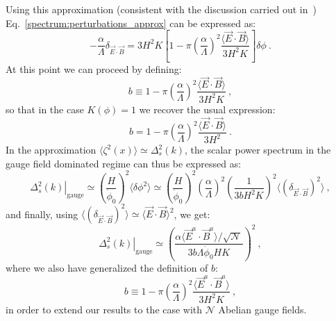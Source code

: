 Using this approximation (consistent with the discussion carried out in~\cite{Linde:2012bt}) Eq.~\eqref{spectrum:perturbations_approx} can be expressed as:
\begin{equation}
	-\frac{\alpha}{\Lambda} \delta_{\vec{E}\cdot \vec{B}} =  3H^2 K \left[ 1  - \pi \left( \frac{\alpha}{\Lambda} \right)^2  \frac{\langle \vec{E}\cdot \vec{B}\rangle}{3 H^2 K}  \right] \delta \phi \ . 
	\label{eq:phiEB}
\end{equation}
At this point we can proceed by defining:
\begin{equation}
	b \equiv  1  -  \pi \left( \frac{\alpha}{\Lambda} \right)^2  \frac{\langle \vec{E}\cdot \vec{B}\rangle}{3 H^2 K} \ ,
\end{equation}
so that in the case $K(\phi) = 1$ we recover the usual expression:
\begin{equation}
	b = 1  -  \pi \left( \frac{\alpha}{\Lambda} \right)^2 \frac{\langle \vec{E}\cdot \vec{B}\rangle}{3 H^2 } \ .
\end{equation}
In the approximation $\langle \zeta^2(x) \rangle \simeq \Delta^2_s (k)  $, the scalar power spectrum in the gauge field dominated regime can thus be expressed as:
\begin{equation}
 	\left.  \Delta^2_s (k) \right|_\text{gauge} \simeq \left(\frac{H}{\dot{\phi}_0}\right)^2 \langle \delta\phi^2 \rangle \simeq \left(\frac{H}{\dot{\phi}_0}\right)^2 \left(\frac{\alpha}{\Lambda}\right)^2 \left(\frac{1}{3 b H^2 K }\right)^2 \langle (\delta_{\vec{E}\cdot \vec{B}})^2 \rangle \ ,
 \end{equation} 
 and finally, using $\langle (\delta_{\vec{E}\cdot \vec{B}})^2 \rangle \simeq \langle \vec{E}\cdot \vec{B} \rangle^2$, we get:
 \begin{equation}
 	\label{spectrum:gauge_sourced}
 	\left.  \Delta^2_s (k) \right|_\text{gauge} \simeq  \left(\frac{\alpha \langle \vec{E}^a \cdot \vec{B}^a  \rangle / \sqrt{\mathcal{N}} }{3 b \Lambda \dot{\phi}_0 H K }\right)^2  \ ,
 \end{equation}
  where we also have generalized the definition of $b$:
  \begin{equation}
	b \equiv  1  -  \pi \left( \frac{\alpha}{\Lambda} \right)^2  \frac{\langle \vec{E}^a \cdot \vec{B}^a  \rangle }{3 H^2 K} \ ,
 \end{equation}
in order to extend our results to the case with $\mathcal{N}$ Abelian gauge fields.
